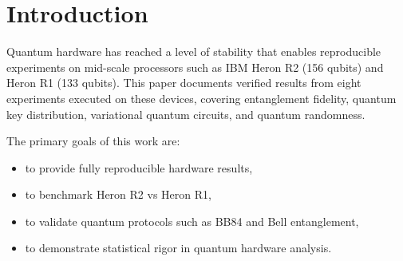 \section{Introduction}

Quantum hardware has reached a level of stability that enables reproducible experiments on mid-scale processors such as IBM Heron R2 (156 qubits) and Heron R1 (133 qubits). This paper documents verified results from eight experiments executed on these devices, covering entanglement fidelity, quantum key distribution, variational quantum circuits, and quantum randomness.

The primary goals of this work are:
\begin{itemize}
    \item to provide fully reproducible hardware results,
    \item to benchmark Heron R2 vs Heron R1,
    \item to validate quantum protocols such as BB84 and Bell entanglement,
    \item to demonstrate statistical rigor in quantum hardware analysis.
\end{itemize}
